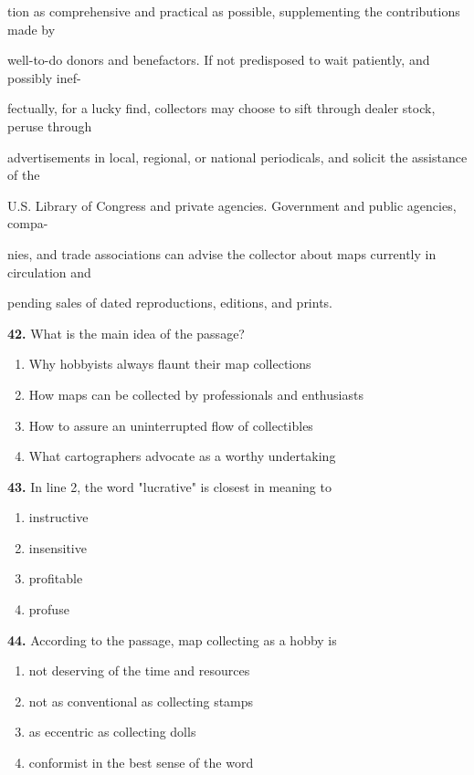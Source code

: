 \documentclass[12pt]{article}
\begin{document}
tion as comprehensive and practical as possible, supplementing the contributions made by\par
well-to-do donors and benefactors. If not predisposed to wait patiently, and possibly inef-\par
fectually, for a lucky find, collectors may choose to sift through dealer stock, peruse through\par
advertisements in local, regional, or national periodicals, and solicit the assistance of the\par
U.S. Library of Congress and private agencies. Government and public agencies, compa-\par
nies, and trade associations can advise the collector about maps currently in circulation and\par
pending sales of dated reproductions, editions, and prints.\par
\endgroup
\medskip
\noindent\textbf{42.} What is the main idea of the passage?
\begin{enumerate}[label=(\Alph*),leftmargin=*,itemsep=0.2em]
\item Why hobbyists always flaunt their map collections
\item How maps can be collected by professionals and enthusiasts
\item How to assure an uninterrupted flow of collectibles
\item What cartographers advocate as a worthy undertaking
\end{enumerate}
\par
\vspace{0.25\baselineskip}
\noindent\textbf{43.} In line 2, the word "lucrative" is closest in meaning to
\begin{enumerate}[label=(\Alph*),leftmargin=*,itemsep=0.2em]
\item instructive
\item insensitive
\item profitable
\item profuse
\end{enumerate}
\par
\vspace{0.25\baselineskip}
\noindent\textbf{44.} According to the passage, map collecting as a hobby is
\begin{enumerate}[label=(\Alph*),leftmargin=*,itemsep=0.2em]
\item not deserving of the time and resources
\item not as conventional as collecting stamps
\item as eccentric as collecting dolls
\item conformist in the best sense of the word
\end{enumerate}
\end{document}
